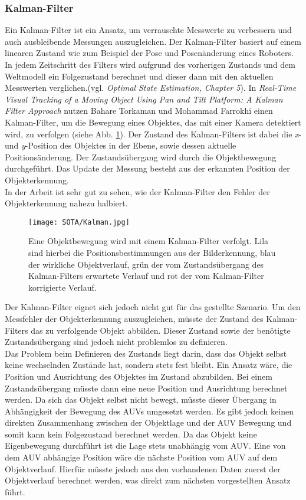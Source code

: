 \subsubsection{Kalman-Filter}
Ein Kalman-Filter ist ein Ansatz, um verrauschte Messwerte zu verbessern und auch ausbleibende Messungen auszugleichen. Der Kalman-Filter basiert auf einem linearen Zustand wie zum Beispiel der Pose und Posenänderung eines Roboters. In jedem Zeitschritt des Filters wird aufgrund des vorherigen Zustands und dem Weltmodell ein Folgezustand berechnet und dieser dann mit den aktuellen Messwerten verglichen.(vgl. \textit{Optimal State Estimation, Chapter 5}\cite{simon2006optimal}).
In \textit{Real-Time Visual Tracking of a Moving Object Using Pan and Tilt Platform: A Kalman Filter Approach}\cite{torkaman2012real} nutzen Bahare Torkaman und Mohammad Farrokhi einen Kalman-Filter, um die Bewegung eines Objektes, das mit einer Kamera detektiert wird, zu verfolgen (siehe Abb. \ref{kalmanFilter}). Der Zustand des Kalman-Filters ist dabei die \textit{x}- und \textit{y}-Position des Objektes in der Ebene, sowie dessen aktuelle Positionsänderung. Der Zustandsübergang wird durch die Objektbewegung durchgeführt. Das Update der Messung besteht aus der erkannten Position der Objekterkennung.\\
In der Arbeit ist sehr gut zu sehen, wie der Kalman-Filter den Fehler der Objekterkennung nahezu halbiert.\\
\begin{figure}[H]
\centering
\texttt{[image: SOTA/Kalman.jpg]}
\caption[Schätzung einer Objektbewegung mit Kalman-Filter.]{Eine Objektbewegung wird mit einem Kalman-Filter verfolgt. Lila sind hierbei die Positionsbestimmungen aus der Bilderkennung, blau der wirkliche Objektverlauf, grün der vom Zustandsübergang des Kalman-Filters erwartete Verlauf und rot der vom Kalman-Filter korrigierte Verlauf.}
\label{kalmanFilter}
\end{figure}
Der Kalman-Filter eignet sich jedoch nicht gut für das gestellte Szenario. Um den Messfehler der Objekterkennung auszugleichen, müsste der Zustand des Kalman-Filters das zu verfolgende Objekt abbilden. Dieser Zustand sowie der benötigte Zustandsübergang sind jedoch nicht problemlos zu definieren.\\
Das Problem beim Definieren des Zustands liegt darin, dass das Objekt selbst keine wechselnden Zustände hat, sondern stets fest bleibt. Ein Ansatz wäre, die Position und Ausrichtung des Objektes im Zustand abzubilden. Bei einem Zustandsübergang müsste dann eine neue Position und Ausrichtung berechnet werden. Da sich das Objekt selbst nicht bewegt, müsste dieser Übergang in Abhängigkeit der Bewegung des AUVs umgesetzt werden. Es gibt jedoch keinen direkten Zusammenhang zwischen der Objektlage und der AUV Bewegung und somit kann kein Folgezustand berechnet werden. Da das Objekt keine Eigenbewegung durchführt ist die Lage stets unabhängig vom AUV. Eine von dem AUV abhängige Position wäre die nächste Position vom AUV auf dem Objektverlauf. Hierfür müsste jedoch aus den vorhandenen Daten zuerst der Objektverlauf berechnet werden, was direkt zum nächsten vorgestellten Ansatz führt.
